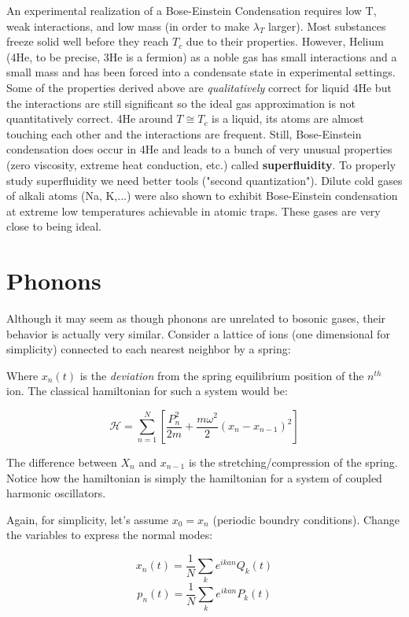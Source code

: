 \documentclass{article}
\newcommand{\sumser}[2]{\sum\limits_{#1}^{#2}}
\begin{document}
An experimental realization of a Bose-Einstein Condensation requires low T, weak interactions, and low mass (in order to make $\lambda_{T}$ larger).  Most substances freeze solid well before they reach $T_{c}$ due to their properties.  However, Helium (4He, to be precise, 3He is a fermion) as a noble gas has small interactions and a small mass and has been forced into a condensate state in experimental settings.  Some of the properties derived above are \textit{qualitatively} correct for liquid 4He but the interactions are still significant so the ideal gas approximation is not quantitatively correct.  4He around $T\cong T_{c}$ is a liquid, its atoms are almost touching each other and the interactions are frequent.  Still, Bose-Einstein condensation does occur in 4He and leads to a bunch of very unusual properties (zero viscosity, extreme heat conduction, etc.) called \textbf{superfluidity}.  To properly study superfluidity we need better tools ("second quantization").  Dilute cold gases of alkali atoms (Na, K,...) were also shown to exhibit Bose-Einstein condensation at extreme low temperatures achievable in atomic traps.  These gases are very close to being ideal.

\section{Phonons}

Although it may seem as though phonons are unrelated to bosonic gases, their behavior is actually very similar.  Consider a lattice of ions (one dimensional for simplicity) connected to each nearest neighbor by a spring:


Where $x_{n}(t)$ is the \textit{deviation} from the spring equilibrium position of the $n^{th}$ ion.  The classical hamiltonian for such a system would be:

$$\mathcal{H}=\sumser{n=1}{N}[\frac{P_{n}^{2}}{2m}+\frac{m\omega^{2}}{2}(x_{n}-x_{n-1})^{2}]$$

The difference between $X_{n}$ and $x_{n-1}$ is the stretching/compression of the spring.  Notice how the hamiltonian is simply the hamiltonian for a system of coupled harmonic oscillators.  

Again, for simplicity, let's assume $x_{0}=x_{n}$ (periodic boundry conditions).  Change the variables to express the normal modes:

$$x_{n}(t)=\frac{1}{N}\sum_{k}e^{ikan}Q_{k}(t)$$
$$p_{n}(t)=\frac{1}{N}\sum_{k}e^{ikan}P_{k}(t)$$
\end{document}
